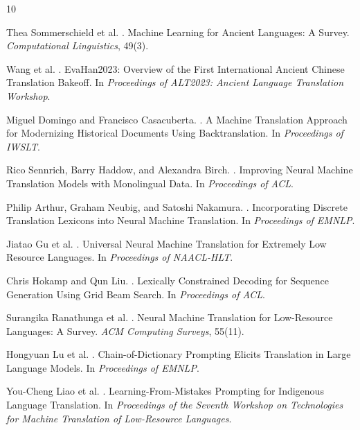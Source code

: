 \begin{thebibliography}{10}
\small

Thea Sommerschield et al.
.
\newblock Machine Learning for Ancient Languages: A Survey.
\newblock \emph{Computational Linguistics}, 49(3).

Wang et al.
.
\newblock EvaHan2023: Overview of the First International Ancient Chinese Translation Bakeoff.
\newblock In \emph{Proceedings of ALT2023: Ancient Language Translation Workshop}.

Miguel Domingo and Francisco Casacuberta.
.
\newblock A Machine Translation Approach for Modernizing Historical Documents Using Backtranslation.
\newblock In \emph{Proceedings of IWSLT}.

Rico Sennrich, Barry Haddow, and Alexandra Birch.
.
\newblock Improving Neural Machine Translation Models with Monolingual Data.
\newblock In \emph{Proceedings of ACL}.

Philip Arthur, Graham Neubig, and Satoshi Nakamura.
.
\newblock Incorporating Discrete Translation Lexicons into Neural Machine Translation.
\newblock In \emph{Proceedings of EMNLP}.

Jiatao Gu et al.
.
\newblock Universal Neural Machine Translation for Extremely Low Resource Languages.
\newblock In \emph{Proceedings of NAACL-HLT}.

Chris Hokamp and Qun Liu.
.
\newblock Lexically Constrained Decoding for Sequence Generation Using Grid Beam Search.
\newblock In \emph{Proceedings of ACL}.

Surangika Ranathunga et al.
.
\newblock Neural Machine Translation for Low-Resource Languages: A Survey.
\newblock \emph{ACM Computing Surveys}, 55(11).

Hongyuan Lu et al.
.
\newblock Chain-of-Dictionary Prompting Elicits Translation in Large Language Models.
\newblock In \emph{Proceedings of EMNLP}.

You-Cheng Liao et al.
.
\newblock Learning-From-Mistakes Prompting for Indigenous Language Translation.
\newblock In \emph{Proceedings of the Seventh Workshop on Technologies for Machine Translation of Low-Resource Languages}.


\end{thebibliography}
